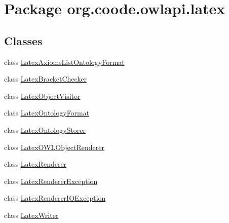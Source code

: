 \hypertarget{namespaceorg_1_1coode_1_1owlapi_1_1latex}{\section{Package org.\-coode.\-owlapi.\-latex}
\label{namespaceorg_1_1coode_1_1owlapi_1_1latex}
}
\subsection*{Classes}
\begin{DoxyCompactItemize}
\item 
class \hyperlink{classorg_1_1coode_1_1owlapi_1_1latex_1_1_latex_axioms_list_ontology_format}{Latex\-Axioms\-List\-Ontology\-Format}
\item 
class \hyperlink{classorg_1_1coode_1_1owlapi_1_1latex_1_1_latex_bracket_checker}{Latex\-Bracket\-Checker}
\item 
class \hyperlink{classorg_1_1coode_1_1owlapi_1_1latex_1_1_latex_object_visitor}{Latex\-Object\-Visitor}
\item 
class \hyperlink{classorg_1_1coode_1_1owlapi_1_1latex_1_1_latex_ontology_format}{Latex\-Ontology\-Format}
\item 
class \hyperlink{classorg_1_1coode_1_1owlapi_1_1latex_1_1_latex_ontology_storer}{Latex\-Ontology\-Storer}
\item 
class \hyperlink{classorg_1_1coode_1_1owlapi_1_1latex_1_1_latex_o_w_l_object_renderer}{Latex\-O\-W\-L\-Object\-Renderer}
\item 
class \hyperlink{classorg_1_1coode_1_1owlapi_1_1latex_1_1_latex_renderer}{Latex\-Renderer}
\item 
class \hyperlink{classorg_1_1coode_1_1owlapi_1_1latex_1_1_latex_renderer_exception}{Latex\-Renderer\-Exception}
\item 
class \hyperlink{classorg_1_1coode_1_1owlapi_1_1latex_1_1_latex_renderer_i_o_exception}{Latex\-Renderer\-I\-O\-Exception}
\item 
class \hyperlink{classorg_1_1coode_1_1owlapi_1_1latex_1_1_latex_writer}{Latex\-Writer}
\end{DoxyCompactItemize}

